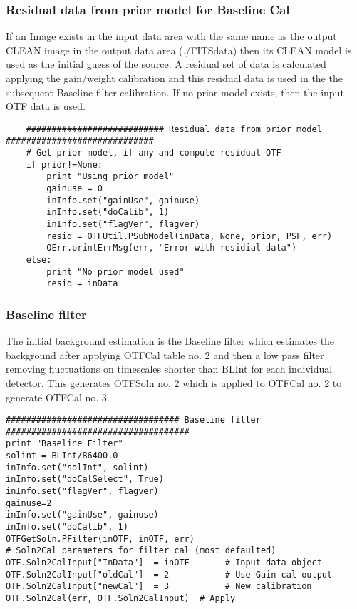\documentclass[11pt]{report}
\begin{document}
\subsubsection{Residual data from prior model for Baseline Cal}
If an Image exists in the input data area with the same name as the
output CLEAN image in the output data area (./FITSdata) then its CLEAN
model is used as the initial guess of the source.
A residual set of data is calculated applying the gain/weight
calibration and this residual data is used in the the subsequent
Baseline filter calibration.
If no prior model exists, then the input OTF data is used.
\begin{verbatim}
    ########################### Residual data from prior model #############################
    # Get prior model, if any and compute residual OTF
    if prior!=None:
        print "Using prior model"
        gainuse = 0
        inInfo.set("gainUse", gainuse)
        inInfo.set("doCalib", 1)
        inInfo.set("flagVer", flagver)
        resid = OTFUtil.PSubModel(inData, None, prior, PSF, err)
        OErr.printErrMsg(err, "Error with residial data")
    else:
        print "No prior model used"
        resid = inData
\end{verbatim}

\subsubsection{Baseline filter}
The initial background estimation is the Baseline filter which
estimates the background after applying OTFCal table no. 2 and then a
low pass filter removing fluctuations on timescales shorter than BLInt
for each individual detector.
This generates OTFSoln no. 2 which is applied to OTFCal no. 2 to generate
OTFCal no. 3.
\begin{verbatim}
################################## Baseline filter ####################################
print "Baseline Filter"
solint = BLInt/86400.0
inInfo.set("solInt", solint)
inInfo.set("doCalSelect", True)
inInfo.set("flagVer", flagver)
gainuse=2
inInfo.set("gainUse", gainuse)
inInfo.set("doCalib", 1)
OTFGetSoln.PFilter(inOTF, inOTF, err)
# Soln2Cal parameters for filter cal (most defaulted)
OTF.Soln2CalInput["InData"]  = inOTF       # Input data object
OTF.Soln2CalInput["oldCal"]  = 2           # Use Gain cal output
OTF.Soln2CalInput["newCal"]  = 3           # New calibration
OTF.Soln2Cal(err, OTF.Soln2CalInput)  # Apply

\end{verbatim}
\end{document}
